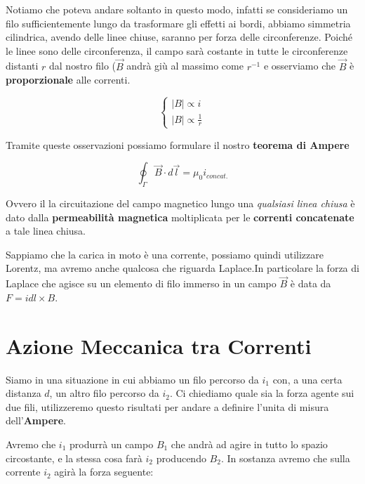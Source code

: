 Notiamo che poteva andare soltanto in questo modo, infatti se consideriamo un filo sufficientemente lungo da trasformare gli effetti ai bordi, abbiamo simmetria cilindrica, avendo delle linee chiuse, saranno per forza delle circonferenze. Poiché le linee sono delle circonferenza, il campo sarà costante in tutte le circonferenze distanti $r$ dal nostro filo ($\vec{B}$ andrà giù al massimo come $r^{-1}$ e osserviamo che $\vec{B}$ è \textbf{proporzionale} alle correnti. 

$$
\begin{cases}
|B| \propto i \\
|B| \propto \frac{1}{r}
\end{cases}
$$

Tramite queste osservazioni possiamo formulare il nostro \textbf{teorema di Ampere}

\begin{tcolorbox}[colframe=red, colback=red!10, title=1° Equazione di Maxwell nel Magnetismo Stazionario]
	\begin{large}
		\begin{equation}
			\oint_\Gamma \vec{B} \cdot d\vec{l} = \mu_0 i_{concat.}
		\end{equation}
	\end{large}
\end{tcolorbox}

Ovvero il la circuitazione del campo magnetico lungo una \textit{qualsiasi linea chiusa} è dato dalla \textbf{permeabilità magnetica} moltiplicata per le \textbf{correnti concatenate} a tale linea chiusa.

Sappiamo che la carica in moto è una corrente, possiamo quindi utilizzare Lorentz, ma avremo anche qualcosa che riguarda Laplace.In particolare la forza di Laplace che agisce su un elemento di filo immerso in un campo $\vec{B}$ è data da $F = idl \times B$. 

\section{Azione Meccanica tra Correnti}
Siamo in una situazione in cui abbiamo un filo percorso da $i_1$ con, a una certa distanza $d$, un altro filo percorso da $i_2$. Ci chiediamo quale sia la forza agente sui due fili, utilizzeremo questo risultati per andare a definire l'unita di misura dell'\textbf{Ampere}. 


Avremo che $i_1$ produrrà un campo $B_1$ che andrà ad agire in tutto lo spazio circostante, e la stessa cosa farà $i_2$ producendo $B_2$. In sostanza avremo che sulla corrente $i_2$ agirà la forza seguente: 

